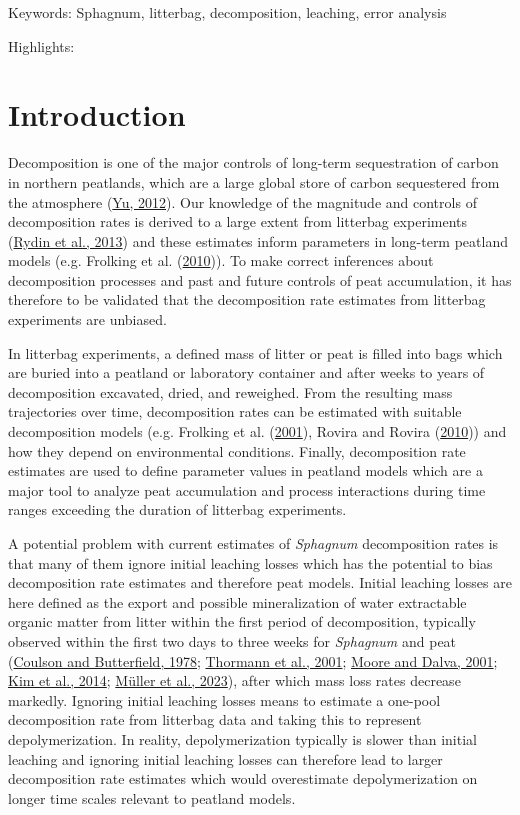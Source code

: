 \documentclass[
  12pt,
]{article}
\begin{document}
Keywords: Sphagnum, litterbag, decomposition, leaching, error analysis

Highlights:

\hypertarget{introduction}{%
\section{Introduction}\label{introduction}}

Decomposition is one of the major controls of long-term sequestration of carbon in northern peatlands, which are a large global store of carbon sequestered from the atmosphere (\protect\hyperlink{ref-Yu.2012}{Yu, 2012}). Our knowledge of the magnitude and controls of decomposition rates is derived to a large extent from litterbag experiments (\protect\hyperlink{ref-Rydin.2013}{Rydin et al., 2013}) and these estimates inform parameters in long-term peatland models (e.g. Frolking et al. (\protect\hyperlink{ref-Frolking.2010}{2010})). To make correct inferences about decomposition processes and past and future controls of peat accumulation, it has therefore to be validated that the decomposition rate estimates from litterbag experiments are unbiased.

In litterbag experiments, a defined mass of litter or peat is filled into bags which are buried into a peatland or laboratory container and after weeks to years of decomposition excavated, dried, and reweighed. From the resulting mass trajectories over time, decomposition rates can be estimated with suitable decomposition models (e.g. Frolking et al. (\protect\hyperlink{ref-Frolking.2001}{2001}), Rovira and Rovira (\protect\hyperlink{ref-Rovira.2010}{2010})) and how they depend on environmental conditions. Finally, decomposition rate estimates are used to define parameter values in peatland models which are a major tool to analyze peat accumulation and process interactions during time ranges exceeding the duration of litterbag experiments.

A potential problem with current estimates of \emph{Sphagnum} decomposition rates is that many of them ignore initial leaching losses which has the potential to bias decomposition rate estimates and therefore peat models. Initial leaching losses are here defined as the export and possible mineralization of water extractable organic matter from litter within the first period of decomposition, typically observed within the first two days to three weeks for \emph{Sphagnum} and peat (\protect\hyperlink{ref-Coulson.1978}{Coulson and Butterfield, 1978}; \protect\hyperlink{ref-Thormann.2001}{Thormann et al., 2001}; \protect\hyperlink{ref-Moore.2001}{Moore and Dalva, 2001}; \protect\hyperlink{ref-Kim.2014}{Kim et al., 2014}; \protect\hyperlink{ref-Muller.2023}{Müller et al., 2023}), after which mass loss rates decrease markedly. Ignoring initial leaching losses means to estimate a one-pool decomposition rate from litterbag data and taking this to represent depolymerization. In reality, depolymerization typically is slower than initial leaching and ignoring initial leaching losses can therefore lead to larger decomposition rate estimates which would overestimate depolymerization on longer time scales relevant to peatland models.
\end{document}
